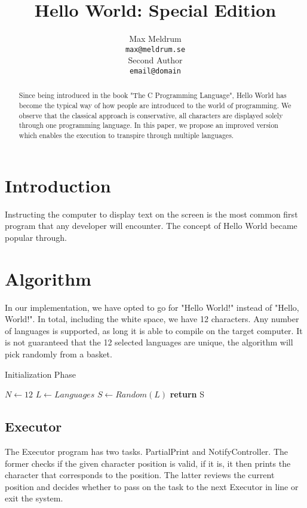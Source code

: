 \documentclass[11pt]{article}
\title{Hello World: Special Edition}
\author{Max Meldrum \\
{\tt max@meldrum.se} \\\And
Second Author \\
{\tt email@domain} \\}
\date{}
\begin{document}
\maketitle
\begin{abstract}
Since being introduced in the book "The C Programming Language", Hello World has become the typical way of how people are introduced to the world of programming. We observe that the classical approach is conservative, all characters are displayed solely through one programming language. In this paper, we propose an improved version which enables the execution to transpire through multiple languages.
\end{abstract}

\section{Introduction}
Instructing the computer to display text on the screen is the most common first program that any developer will encounter. The concept of Hello World became popular through\cite{Kernighan:1988:CPL:576122}. 

\section{Algorithm}
In our implementation, we have opted to go for "Hello World!" instead of "Hello, World!". In total, including the white space, we have 12 characters. Any number of languages is supported, as long it is able to compile on the target computer. It is not guaranteed that the 12 selected languages are unique, the algorithm will pick randomly from a basket.
\begin{algorithm}
\caption{Initialization Phase}
\label{Special Edition}
\begin{algorithmic}[1]
\State $N\gets 12$
\State $L\gets Languages$
	\State $S\gets Random(L)$
\EndFor
\State \textbf{return} S
\EndProcedure
\end{algorithmic}
\end{algorithm}

\subsection{Executor}
The Executor program has two tasks. PartialPrint and NotifyController. The former checks if the given character position is valid, if it is, it then prints the character that corresponds to the position. The latter reviews the current position and decides whether to pass on the task to the next Executor in line or exit the system.
\end{document}

